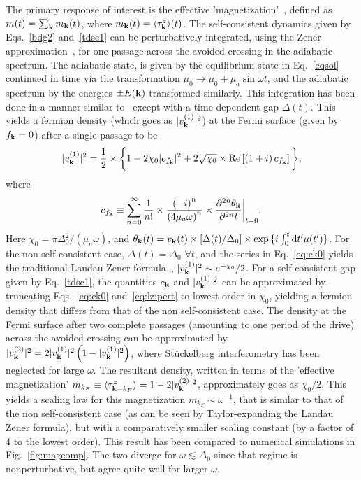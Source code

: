 \documentclass[aps,pra,floats,epsfig,pdflatex]{revtex4}                                                              %
\begin{document}
The primary response of interest is the effective 'magnetization'~\cite{arnab1}, defined as $m(t)=\sum_{\bf k}m_{\bf k}(t)$, where $m_{\bf k}(t)=\langle \tau^z_{\bf k} \rangle(t)$. The self-consistent dynamics given by Eqs.~\ref{bdg2} and~\ref{tdsc1} can be perturbatively integrated, using the Zener approximation~\cite{wittig:lzformula}, for one passage across the avoided crossing in the adiabatic spectrum. The adiabatic state, is given by the equilibrium state in Eq.~\ref{eqsol} continued in time via the transformation
$\mu_0\rightarrow\mu_0+\mu_a\sin{\omega t}$, and the adiabatic spectrum by the energies $\pm E({\bf k})$ transformed similarly. This integration has been done in a manner similar to~\cite{wittig:lzformula} except with a time dependent gap $\Delta(t)$. This yields a fermion density (which goes as $|v^{(1)}_{\bf k}|^2$) at the Fermi surface (given by $f_{\bf k}=0$) after a single passage to be
\begin{equation}
\label{eq:lz:pert}
|{v}^{(1)}_{\bf k}|^2  =  \frac{1}{2}\times\bigg\{1-2\chi_0 |c_{f_{\bf k}}|^2+2\sqrt{\chi_0}\times{\rm Re}\left[\left(1+i\right)c_{f_{\bf k}}\right]\bigg\}, 
\end{equation}
where
\begin{equation}
\label{eq:ck0}
c_{f_{\bf k}} \equiv \sum^\infty_{n=0} \frac{1}{n!}\times\frac{\left(-i\right)^n}{\left(4\mu_a\omega\right)^n} \times \frac{\partial^{2n}\theta_{\bf k}}{\partial^{2n}t}\bigg|_{t=0}.
\end{equation}
Here $\chi_0=\pi\Delta^2_0/(\mu_a\omega)$, and $\theta_{\bf k}(t)=v_{\bf k}(t)\times[\Delta(t)/\Delta_0]\times\exp{\{i\int^t_0\mathrm{d}t' \mu(t')\}}$. For the non self-consistent case, $\Delta(t)=\Delta_0$ $\forall t$, and the series in Eq.~\ref{eq:ck0} yields the traditional Landau Zener formula~\cite{wittig:lzformula}, $|v^{(1)}_{\bf k}|^2\sim e^{-\chi_0}/2$. For a self-consistent gap given by Eq.~\ref{tdsc1}, 
the quantities $c_{\bf k}$ and $|{v}^{(1)}_{\bf k}|^2$ can be approximated by truncating Eqs.~\ref{eq:ck0} and~\ref{eq:lz:pert} to lowest order in $\chi_0$, yielding a fermion density that differs from that of the non self-consistent case. The density at the Fermi surface after two complete passages (amounting to one period of the drive) across the avoided crossing can be approximated by~\cite{review:lzstls} $ |{v}^{(2)}_{\bf k}|^2 = 2 |{v}^{(1)}_{\bf k}|^2 \left(1-|{v}^{(1)}_{\bf k}|^2\right)$,
where St\"uckelberg interferometry has been neglected for large $\omega$. The resultant density, written in terms of the 'effective magnetization' $m_{k_F} \equiv \langle\tau^z_{{\bf k}=k_F}\rangle  = 1-2|{v}^{(2)}_{\bf k}|^2$, approximately goes as ${\chi_0}/{2}$. This yields a scaling law for this magnetization $m_{k_F}\sim\omega^{-1}$, that is similar to that of the non self-consistent case (as can be seen by Taylor-expanding the Landau Zener formula), but with a comparatively smaller scaling constant (by a factor of $4$ to the lowest order). This result has been compared to numerical simulations in Fig.~\ref{fig:magcomp}. The two diverge for $\omega\lesssim\Delta_0$ since that regime is nonperturbative, but agree quite well for larger $\omega$.
\end{document}

